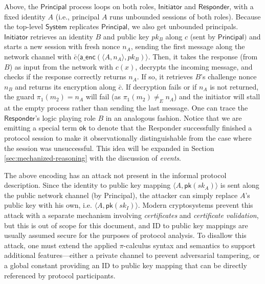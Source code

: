 \documentclass{article}
\theoremstyle{definition}
\begin{document}
Above, the $\mathsf{Principal}$ process loops on both roles, $\mathsf{Initiator}$ and $\mathsf{Responder}$, 
with a fixed identity $A$ (i.e., principal $A$ runs unbounded sessions of both roles). 
Because the top-level $\mathsf{System}$ replicates $\mathsf{Principal}$, we also get unbounded principals. 
$\mathsf{Initiator}$ retrieves an identity $B$ and public key $pk_B$ along $c$ (sent by $\textsf{Principal})$ 
and starts a new session with fresh nonce $n_A$, sending the first message along the network channel with 
$\bar c \langle \mathsf{a\_enc}(\langle A, n_A \rangle,pk_B)\rangle$. 
Then, it takes the response (from $B$) as input from the network with $c(x)$, 
decrypts the incoming message, and checks if the response correctly returns $n_A$. 
If so, it retrieves $B$'s challenge nonce $n_B$ and returns its encryption along $\bar c$. 
If decryption fails or if $n_A$ is not returned, the guard $\pi_1(m_2) = n_A$ will fail (as $\pi_1(m_2) \neq_E n_A$) 
and the initiator will stall at the empty process rather than sending the last message. 
One can trace the $\mathsf{Responder}$'s logic playing role $B$ in an analogous fashion. 
Notice that we are emitting a special term $\textsf{ok}$ to denote that the \textsf{Responder} 
successfully finished a protocol session to make it observationally distinguishable from the case 
where the session was unsuccessful. 
This idea will be expanded in Section \ref{sec:mechanized-reasoning} with the discussion of \emph{events}.

The above encoding has an attack not present in the informal protocol description. Since the identity to public key mapping $\langle A, \mathsf{pk}(sk_A)\rangle$ is sent along the public network channel (by \textsf{Principal}), the attacker can simply replace $A$'s public key with his own, i.e. $\langle A, \mathsf{pk}(sk_I)\rangle$. Modern cryptosystems prevent this attack with a separate mechanism involving \textit{certificates} and \textit{certificate validation}, but this is out of scope for this document, and ID to public key mappings are usually assumed secure for the purposes of protocol analysis.
To disallow this attack, one must extend the applied $\pi$-calculus syntax and semantics to support additional features---either a private channel to prevent adversarial tampering, or a global constant providing an ID to public key mapping that can be directly referenced by protocol participants.
\end{document}
